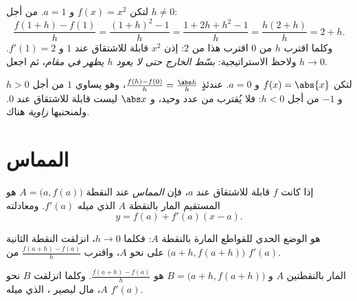 \begin{example}\label{ex:g11:deriv:atpoint}
لتكن $f(x) = x^2$ و $a = 1$. من أجل $h \neq 0$:
\[
\frac{f(1+h) - f(1)}{h}
= \frac{(1+h)^2 - 1}{h}
= \frac{1 + 2h + h^2 - 1}{h}
= \frac{h(2 + h)}{h}
= 2 + h .
\]
وكلما اقترب $h$ من $0$ اقترب هذا من $2$: إذن  $x^2$
قابلة للاشتقاق عند $1$ و $f'(1) = 2$. ولاحظ الاستراتيجية: \emph{بسّط
الخارج حتى لا يعود $h$ يظهر في مقام}، ثم اجعل
$h \to 0$.
\end{example}

\begin{example}
لتكن $f(x) = \abs{x}$ و $a = 0$. عندئذٍ
$\frac{f(h) - f(0)}{h} = \frac{\abs h}{h}$، وهو يساوي $1$ من أجل $h > 0$
و $-1$ من أجل $h < 0$: فلا يُقترب من عدد وحيد، و $\abs x$ ليست
قابلة للاشتقاق عند $0$. ولمنحنيها \emph{زاوية} هناك.
\end{example}

\section{المماس}

\begin{definition}[المماس]\label{def:g11:deriv:tangent}
إذا كانت $f$ قابلة للاشتقاق عند $a$، فإن \emph{المماس}
 عند النقطة $A = \bigl(a, f(a)\bigr)$ هو المستقيم المار بالنقطة $A$ الذي
ميله $f'(a)$. ومعادلته
\[
y = f(a) + f'(a)(x - a).
\]
\end{definition}

 هو الوضع الحدي للقواطع المارة بالنقطة $A$: فكلما
$h \to 0$، انزلقت النقطة الثانية $\bigl(a+h, f(a+h)\bigr)$ على
 نحو $A$، واقترب   $\frac{f(a+h)-f(a)}{h}$
من $f'(a)$.

\begin{omfigure}

{\small {}  المار بالنقطتين $A$ و $B = \bigl(a+h, f(a+h)\bigr)$ هو
$\frac{f(a+h)-f(a)}{h}$. وكلما انزلقت $B$ نحو $A$، مال  ليصير
، الذي ميله $f'(a)$.}
\end{omfigure}

